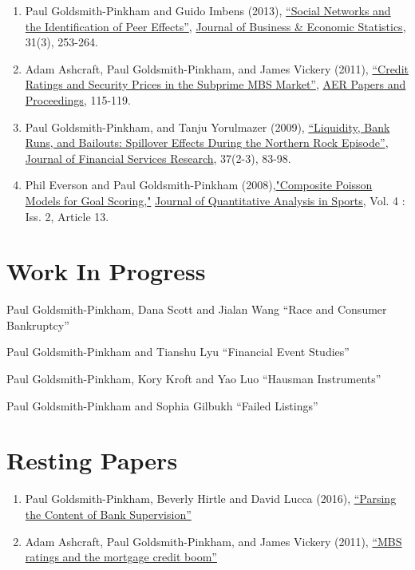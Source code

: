 \documentclass[letterpaper]{article}
\renewenvironment{itemize}{
  \begin{list}{}
    { \setlength{\itemsep}{5pt}
      \setlength{\parsep}{0pt}
      \setlength{\topsep}{0pt}
      \setlength{\leftmargin}{0em} } }{
  \end{list}}
\begin{document}
\begin{enumerate}
\item Paul Goldsmith-Pinkham and Guido Imbens (2013), \href{http://www.tandfonline.com/doi/pdf/10.1080/07350015.2013.801251}{``Social Networks and the Identification of Peer Effects''}, \ul{Journal of Business \& Economic Statistics}, 31(3), 253-264.
\item Adam Ashcraft, Paul Goldsmith-Pinkham, and James Vickery (2011), \href{http://papers.ssrn.com.ezp-prod1.hul.harvard.edu/sol3/papers.cfm?abstract_id=1856823}{``Credit Ratings
    and Security Prices in the Subprime MBS Market''}, \ul{AER Papers and Proceedings},  115-119. 
\item Paul Goldsmith-Pinkham, and Tanju Yorulmazer (2009), \href{http://www.springerlink.com/content/ww187761jgr660q5/}{``Liquidity, Bank Runs, and Bailouts: Spillover Effects During the Northern Rock Episode''}, \ul{Journal of Financial Services Research}, 37(2-3), 83-98. 
\item Phil Everson and Paul Goldsmith-Pinkham (2008),\href{http://www.bepress.com/jqas/vol4/iss2/13/}{"Composite Poisson Models for Goal Scoring,"} \ul{Journal of Quantitative Analysis in Sports}, Vol. 4 : Iss. 2, Article 13.
\end{enumerate}


\section*{Work In Progress}
\begin{itemize}
\item Paul Goldsmith-Pinkham, Dana Scott and Jialan Wang ``Race and Consumer Bankruptcy''
\item Paul Goldsmith-Pinkham and Tianshu Lyu ``Financial Event Studies''
\item Paul Goldsmith-Pinkham, Kory Kroft and Yao Luo ``Hausman Instruments''
\item Paul Goldsmith-Pinkham and Sophia Gilbukh ``Failed Listings''
\end{itemize}

\section*{Resting Papers}
\begin{enumerate}
\item Paul Goldsmith-Pinkham, Beverly Hirtle and David Lucca (2016), \href{https://www.newyorkfed.org/research/staff_reports/sr770.html}{``Parsing the Content of Bank Supervision''}
\item Adam Ashcraft, Paul Goldsmith-Pinkham, and James Vickery (2011), \href{http://papers.ssrn.com/sol3/papers.cfm?abstract_id=1615613}{``MBS ratings and the mortgage credit boom''}
\end{enumerate}
\end{document}
